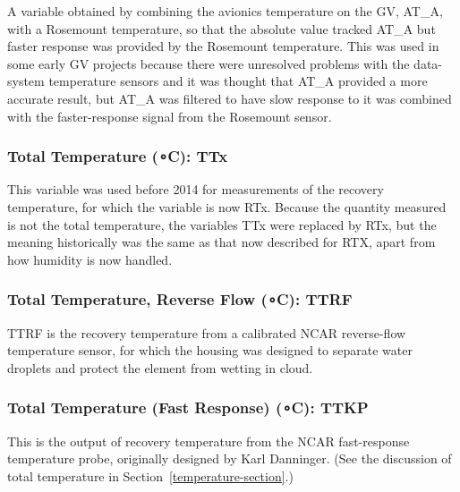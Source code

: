 \documentclass[
  english,
]{book}
\begin{document}
A variable obtained by combining the avionics temperature on the GV, AT\_A, with a Rosemount temperature, so that the absolute value tracked AT\_A but faster response was provided by the Rosemount temperature. This was used in some early GV projects because there were unresolved problems with the data-system temperature sensors and it was thought that AT\_A provided a more accurate result, but AT\_A was filtered to have slow response to it was combined with the faster-response signal from the Rosemount sensor.

\hypertarget{ttx}{%
\subsubsection*{\texorpdfstring{Total Temperature ({∘}C): TTx}{Total Temperature (∘C): TTx}}\label{ttx}}

This variable was used before 2014 for measurements of the recovery temperature, for which the variable is now RTx. Because the quantity measured is not the total temperature, the variables TTx were replaced by RTx, but the meaning historically was the same as that now described for RTX, apart from how humidity is now handled.

\hypertarget{ttrf}{%
\subsubsection*{\texorpdfstring{Total Temperature, Reverse Flow ({∘C}): TTRF}{Total Temperature, Reverse Flow (∘C): TTRF}}\label{ttrf}}

TTRF is the recovery temperature from a calibrated NCAR reverse-flow temperature sensor, for which the housing was designed to separate water droplets and protect the element from wetting in cloud.

\hypertarget{ttkp}{%
\subsubsection*{\texorpdfstring{Total Temperature (Fast Response) ({∘C}): TTKP}{Total Temperature (Fast Response) (∘C): TTKP}}\label{ttkp}}

This is the output of recovery temperature from the NCAR fast-response temperature probe, originally designed by Karl Danninger. (See the discussion of total temperature in Section~\ref{temperature-section}.)
\end{document}

